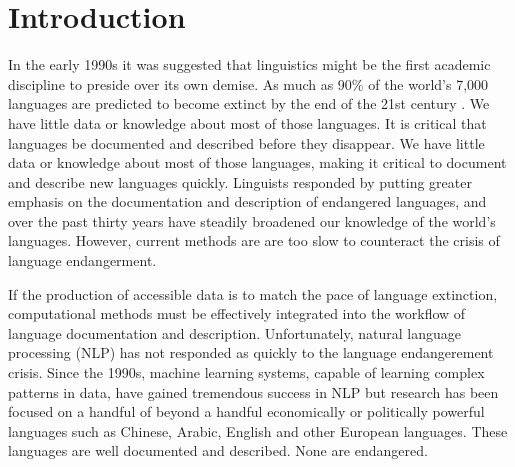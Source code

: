 \chapter{Introduction}
\label{chap:intro}

In the early 1990s it was suggested that linguistics might be the first academic discipline to preside over its own demise. As much as 90\% of the world’s 7,000 languages are predicted to become extinct by the end of the 21st century \citep{krauss_worlds_1992,krauss_keynote--mass_2007,campbell_new_2013}. We have little data or knowledge about most of those languages. It is critical that languages  be documented and described before they disappear. %
We have little data or knowledge about most of those languages, making it critical to document and describe new languages quickly. Linguists responded by putting greater emphasis on the documentation and description of endangered languages, and over the past thirty years have steadily broadened our knowledge of the world's languages. However, current methods are
are too slow to counteract the crisis of language endangerment. 

If the production of accessible data is to match the pace of language extinction, computational methods must be effectively integrated into the workflow of language documentation and description. Unfortunately, natural language processing (NLP) has not responded as quickly to the language endangerement crisis. Since the 1990s, machine learning systems, capable of learning complex patterns in data, have gained tremendous success in NLP
but research has been focused on a handful of beyond a handful economically or politically powerful languages such as Chinese, Arabic, English and other European languages. These languages are well documented and described. None 
are endangered.%

